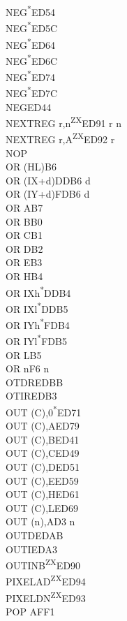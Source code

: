 \documentclass[twoside,openright,a4paper]{book}
\begin{document}
\begin{multicols}{3}
{\begin{tabbing}
	NEG\textsuperscript{*}\>ED54\\
	NEG\textsuperscript{*}\>ED5C\\
	NEG\textsuperscript{*}\>ED64\\
	NEG\textsuperscript{*}\>ED6C\\
	NEG\textsuperscript{*}\>ED74\\
	NEG\textsuperscript{*}\>ED7C\\
	NEG\>ED44\\
	NEXTREG r,n\textsuperscript{ZX}\>ED91 r n\\
	NEXTREG r,A\textsuperscript{ZX}\>ED92 r\\
	NOP\\
	OR (HL)\>B6\\
	OR (IX+d)\>DDB6 d\\
	OR (IY+d)\>FDB6 d\\
	OR A\>B7\\
	OR B\>B0\\
	OR C\>B1\\
	OR D\>B2\\
	OR E\>B3\\
	OR H\>B4\\
	OR IXh\textsuperscript{*}\>DDB4\\
	OR IXl\textsuperscript{*}\>DDB5\\
	OR IYh\textsuperscript{*}\>FDB4\\
	OR IYl\textsuperscript{*}\>FDB5\\
	OR L\>B5\\
	OR n\>F6 n\\
	OTDR\>EDBB\\
	OTIR\>EDB3\\
	OUT (C),0\textsuperscript{*}\>ED71\\
	OUT (C),A\>ED79\\
	OUT (C),B\>ED41\\
	OUT (C),C\>ED49\\
	OUT (C),D\>ED51\\
	OUT (C),E\>ED59\\
	OUT (C),H\>ED61\\
	OUT (C),L\>ED69\\
	OUT (n),A\>D3 n\\
	OUTD\>EDAB\\
	OUTI\>EDA3\\
	OUTINB\textsuperscript{ZX}\>ED90\\
	PIXELAD\textsuperscript{ZX}\>ED94\\
	PIXELDN\textsuperscript{ZX}\>ED93\\
	POP AF\>F1\\

\end{tabbing}}
\end{multicols}
\end{document}

